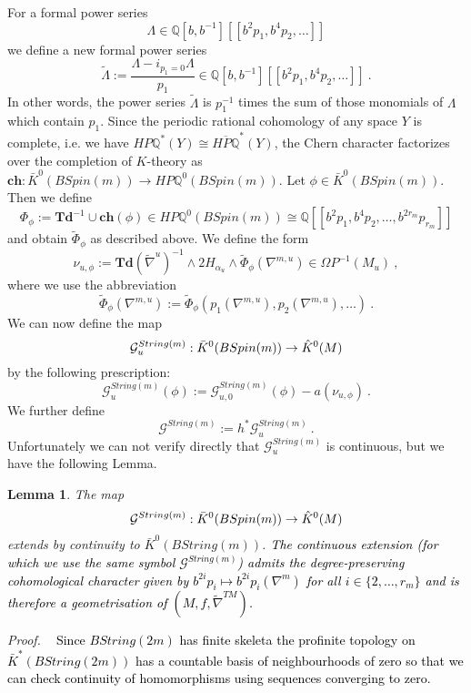 \documentclass[12pt]{article}
\newtheorem{lem}[theorem]{Lemma}
\newcommand{\cG}{{\mathcal{G}}}
\newcommand{\proof}{{\it Proof.$\:\:\:\:$}}
\newcommand{\Q}{{\mathbb{Q}}}
\newcommand{\Td}{{\mathbf{Td}}}
\newcommand{\ch}{{\mathbf{ch}}}
\begin{document}
For a formal power series 
$$\Lambda\in \Q[b,b^{-1}][[b^{2}p_{1},b^{4}p_{2},\dots]]$$ we define a new formal power series
\begin{equation}\label{cont2}\tilde \Lambda:=\frac{\Lambda-i_{p_{1}=0} \Lambda}{p_{1}}\in \Q[b,b^{-1}][[b^{2}p_{1},b^{4}p_{2},\dots]]\ .\end{equation}
In other words, the power series
$\tilde \Lambda$ is  $p_{1}^{-1}$ times the sum of those monomials of $\Lambda$ which contain $p_{1}$.
Since the periodic rational cohomology of any space $Y$ is complete, i.e.  we have
$HP\Q^{*}(Y)\cong \overline{HP\Q}^{*}(Y)$,  the Chern character factorizes over the completion of $K$-theory as
$\ch:\bar K^{0}(BSpin(m))\to HP\Q^{0}(BSpin(m))$. 
Let $\phi\in \bar K^{0}(BSpin(m))$. Then we define
\begin{equation}\label{er10v}\Phi_{\phi}:=\Td^{-1}\cup \ch(\phi)\in HP\Q^{0}(BSpin(m))\cong  \Q[[b^{2}p_{1},b^{4}p_{2},\dots,b^{2r_{m}}p_{r_{m}}]]\end{equation}
and obtain $\tilde \Phi_{\phi}$ as described above. We define the form
$$\nu_{u,\phi}:=\Td(\tilde \nabla^{u})^{-1}\wedge 2H_{\alpha_{u}}\wedge \tilde \Phi_{\phi}(\nabla^{m,u})\in \Omega P^{-1}(M_{u})\ ,$$
where we use the abbreviation
\begin{equation}\label{er10}\tilde \Phi_{\phi}(\nabla^{m,u}):= \tilde \Phi_{\phi}(p_{1}(\nabla^{m,u}),p_{2}(\nabla^{m,u}),\dots)\ .\end{equation}
We can now define the map 
$$\cG^{String(m)}_{u}: \textcolor{black}{\bar K^{0}(BSpin(m))}\to \hat K^{0}(M)$$ by the following prescription:
$$\cG_{u}^{String(m)}( \phi ):=\cG^{String(m)}_{u,0}( \phi) -a(\nu_{u,\phi})\ .$$
We further define
$$\cG^{String(m)}:=h^{*}\cG_{u}^{String(m)}\ .$$ 
Unfortunately we can not verify directly that $\cG_{u}^{String(m)}$ is continuous, but we have the following Lemma.
\begin{lem}\label{cont1}
The map
$$\cG^{String(m)}: \textcolor{black}{\bar K^{0}(BSpin(m))} \to \hat K^{0}(M)$$
extends by continuity to  $\bar K^{0}(BString(m))$.  \textcolor{black}{
The continuous extension (for which we use the same symbol $\cG^{String(m)}$)  admits the degree-preserving cohomological character given by $b^{2i}p_{i}\mapsto b^{2i}p_{i}(\nabla^{m})$ for all $i\in \{2,\dots,r_{m}\}$ and
is therefore a geometrisation of $(M,f,\tilde \nabla^{TM})$.}
 \end{lem}
 \proof
 \textcolor{black}{
 Since $BString(2m)$ has finite  skeleta  the profinite topology on $\bar K^{*}(BString(2m))$
 has a countable basis of neighbourhoods of zero so that we can check continuity of homomorphisms using sequences converging to zero.}
\end{document}
